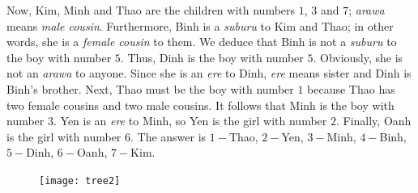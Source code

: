\begin{multicols}{2}
	\vskip 0.1cm
	Now, Kim, Minh and Thao are the children with numbers $1$, $3$ and $7$; \emph{arawa} means \emph{male cousin}.
	Furthermore, Binh is a \textit{suburu} to Kim and Thao;
	in other words, she is a \textit{female cousin} to them.
	\vskip 0.1cm
	We deduce that Binh is not a \emph{suburu} to the boy with number $5$. Thus, Dinh is the boy with number $5$.
	Obviously, she is not an \textit{arawa} to anyone.
	Since she is an \textit{ere} to Dinh, \emph{ere} means {sister} and Dinh is Binh's brother.
	\vskip 0.1cm
	Next, Thao must be the boy with number $1$ because Thao has two female cousins and two male cousins. It follows that Minh is the boy with number $3$.
	\vskip 0.1cm
	Yen is an \emph{ere} to Minh, so Yen is the girl with number $2$. Finally, Oanh is the girl with number $6$.
	\vskip 0.1cm
	The answer is $1-$Thao, $2-$Yen, $3-$Minh, $4-$Binh, $5-$Dinh, $6-$Oanh, $7-$Kim.
	\vskip 0.25cm
\end{multicols}
\begin{figure}[H]
	\vspace*{-5pt}
	\centering
	\captionsetup{labelformat= empty, justification=centering}
	\texttt{[image: tree2]}
	\vspace*{-5pt}
\end{figure}